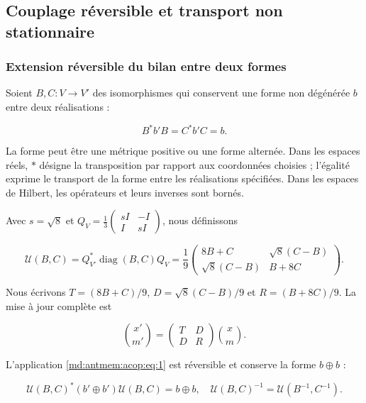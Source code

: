 \subsection{Couplage réversible et transport non stationnaire}
\label{md:antmem:acoplamiento}
\subsubsection{Extension réversible du bilan entre deux formes}

Soient \(B,C:V\to V'\) des isomorphismes qui conservent une forme non dégénérée \(b\) entre deux réalisations :

\[
B^*b'B=C^*b'C=b.
\]

La forme peut être une métrique positive ou une forme alternée. Dans les espaces réels, \(*\) désigne la transposition par rapport aux coordonnées choisies ; l’égalité exprime le transport de la forme entre les réalisations spécifiées. Dans les espaces de Hilbert, les opérateurs et leurs inverses sont bornés.


Avec \(s=\sqrt8\) et \(Q_V=\frac13\left(\begin{smallmatrix}sI&-I\\I&sI\end{smallmatrix}\right)\), nous définissons

\begin{equation}
\boxed{
\mathcal U(B,C)=Q_{V'}^*\operatorname{diag}(B,C)Q_V
=\frac19\begin{pmatrix}8B+C&\sqrt8(C-B)\\\sqrt8(C-B)&B+8C\end{pmatrix}.}
\label{md:antmem:acop:eq:1}
\end{equation}

Nous écrivons \(T=(8B+C)/9\), \(D=\sqrt8(C-B)/9\) et \(R=(B+8C)/9\). La mise à jour complète est

\begin{equation}
\binom{x'}{m'}=\begin{pmatrix}T&D\\D&R\end{pmatrix}\binom{x}{m}.
\label{md:antmem:acop:eq:2}
\end{equation}

\begin{theorem}
L’application \eqref{md:antmem:acop:eq:1} est réversible et conserve la forme \(b\oplus b\) :

\begin{equation}
\mathcal U(B,C)^*(b'\oplus b')\mathcal U(B,C)=b\oplus b,
\quad\mathcal U(B,C)^{-1}=\mathcal U(B^{-1},C^{-1}).
\label{md:antmem:acop:eq:3}
\end{equation}
\end{theorem}


